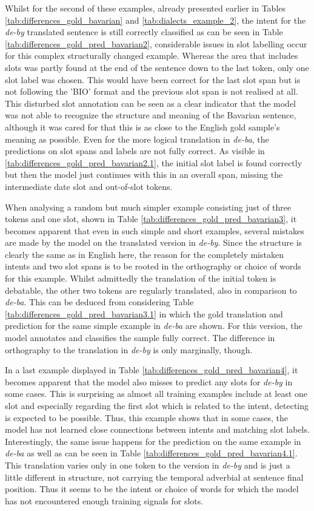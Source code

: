 \documentclass[11pt,a4paper,twoside,openright]{scrbook}
\begin{document}
Whilst for the second of these examples, already presented earlier in Tables \ref{tab:differences_gold_bavarian} and \ref{tab:dialects_example_2}, the intent for the \textit{de-by} translated sentence is still correctly classified as can be seen in Table \ref{tab:differences_gold_pred_bavarian2}, considerable issues in slot labelling occur for this complex structurally changed example. Whereas the area that includes slots was partly found at the end of the sentence down to the last token, only one slot label was chosen. This would have been correct for the last slot span but is not following the 'BIO' format and the previous slot span is not realised at all. This disturbed slot annotation can be seen as a clear indicator that the model was not able to recognize the structure and meaning of the Bavarian sentence, although it was cared for that this is as close to the English gold sample's meaning as possible. Even for the more logical translation in \textit{de-ba}, the predictions on slot spans and labels are not fully correct. As visible in \ref{tab:differences_gold_pred_bavarian2.1}, the initial slot label is found correctly but then the model just continues with this in an overall span, missing the intermediate date slot and out-of-slot tokens.

When analysing a random but much simpler example consisting just of three tokens and one slot, shown in Table \ref{tab:differences_gold_pred_bavarian3}, it becomes apparent that even in such simple and short examples, several mistakes are made by the model on the translated version in \textit{de-by}. Since the structure is clearly the same as in English here, the reason for the completely mistaken intents and two slot spans is to be rooted in the orthography or choice of words for this example. Whilst admittedly the translation of the initial token is debatable, the other two tokens are regularly translated, also in comparison to \textit{de-ba}. This can be deduced from considering Table \ref{tab:differences_gold_pred_bavarian3.1} in which the gold translation and prediction for the same simple example in \textit{de-ba }are shown. For this version, the model annotates and classifies the sample fully correct. The difference in orthography to the translation in \textit{de-by} is only marginally, though.

In a last example displayed in Table \ref{tab:differences_gold_pred_bavarian4}, it becomes apparent that the model also misses to predict any slots for \textit{de-by} in some cases. This is surprising as almost all training examples include at least one slot and especially regarding the first slot which is related to the intent, detecting is expected to be possible. Thus, this example shows that in some cases, the model has not learned close connections between intents and matching slot labels. Interestingly, the same issue happens for the prediction on the same example in \textit{de-ba} as well as can be seen in Table \ref{tab:differences_gold_pred_bavarian4.1}. This translation varies only in one token to the version in \textit{de-by} and is just a little different in structure, not carrying the temporal adverbial at sentence final position. Thus it seems to be the intent or choice of words for which the model has not encountered enough training signals for slots.
\end{document}
